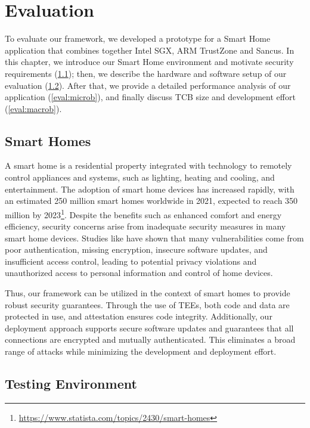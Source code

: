 \section{Evaluation}
\label{sec:evaluation}

To evaluate our framework, we developed a prototype for a Smart Home application
that combines together Intel \ac{SGX}, ARM TrustZone and Sancus. In this
chapter, we  introduce our Smart Home environment and motivate security
requirements (\cref{eval:intro}); then, we describe the hardware and software
setup of our evaluation (\cref{eval:test-env}). After that, we provide a
detailed performance analysis of our application (\cref{eval:microb}), and
finally discuss \ac{TCB} size and development effort (\cref{eval:macrob}).

\subsection{Smart Homes}
\label{eval:intro}

A smart home is a residential property integrated with technology to remotely
control appliances and systems, such as lighting, heating and cooling, and
entertainment. The adoption of smart home devices has increased rapidly, with an
estimated 250 million smart homes worldwide in 2021, expected to reach 350
million by
2023\footnote{\url{https://www.statista.com/topics/2430/smart-homes}}. Despite
the benefits such as enhanced comfort and energy efficiency, security concerns
arise from inadequate security measures in many smart home devices. Studies like
\cite{davis2020vulnerability} have shown that many vulnerabilities come from
poor authentication, missing encryption, insecure software updates, and
insufficient access control, leading to potential privacy violations and
unauthorized access to personal information and control of home devices.

Thus, our framework can be utilized in the context of smart homes to provide
robust security guarantees. Through the use of \acp{TEE}, both code and data are
protected in use, and attestation ensures code integrity. Additionally, our
deployment approach supports secure software updates and guarantees that all
connections are encrypted and mutually authenticated. This eliminates a broad
range of attacks while minimizing the development and deployment effort.

\subsection{Testing Environment}
\label{eval:test-env}

